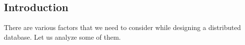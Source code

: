 \subsection{Introduction}

There are various factors that we need to consider while designing a distributed database. Let us analyze some of them.